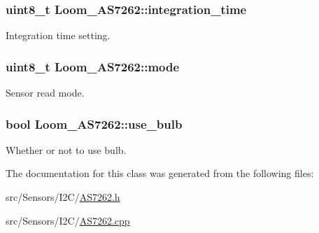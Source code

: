 \subsubsection[{\texorpdfstring{integration\+\_\+time}{integration_time}}]{\setlength{\rightskip}{0pt plus 5cm}uint8\+\_\+t Loom\+\_\+\+A\+S7262\+::integration\+\_\+time\hspace{0.3cm}{\ttfamily [protected]}}\hypertarget{class_loom___a_s7262_aa8b8b093c0eabd30a7534270accae5c0}{}\label{class_loom___a_s7262_aa8b8b093c0eabd30a7534270accae5c0}


Integration time setting. 

\subsubsection[{\texorpdfstring{mode}{mode}}]{\setlength{\rightskip}{0pt plus 5cm}uint8\+\_\+t Loom\+\_\+\+A\+S7262\+::mode\hspace{0.3cm}{\ttfamily [protected]}}\hypertarget{class_loom___a_s7262_afae9fa2dc1e8bac95947f957449212f2}{}\label{class_loom___a_s7262_afae9fa2dc1e8bac95947f957449212f2}


Sensor read mode. 

\subsubsection[{\texorpdfstring{use\+\_\+bulb}{use_bulb}}]{\setlength{\rightskip}{0pt plus 5cm}bool Loom\+\_\+\+A\+S7262\+::use\+\_\+bulb\hspace{0.3cm}{\ttfamily [protected]}}\hypertarget{class_loom___a_s7262_a2fa9b5aeb99ac06738a52c3716053a89}{}\label{class_loom___a_s7262_a2fa9b5aeb99ac06738a52c3716053a89}


Whether or not to use bulb. 



The documentation for this class was generated from the following files\+:\begin{DoxyCompactItemize}
\item 
src/\+Sensors/\+I2\+C/\hyperlink{_a_s7262_8h}{A\+S7262.\+h}\item 
src/\+Sensors/\+I2\+C/\hyperlink{_a_s7262_8cpp}{A\+S7262.\+cpp}\end{DoxyCompactItemize}
